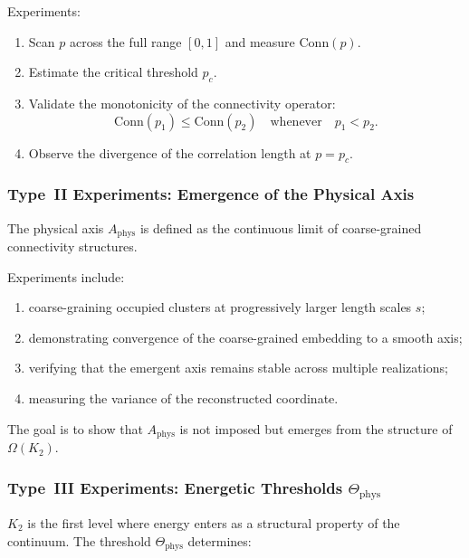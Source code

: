 Experiments:

\begin{enumerate}
    \item Scan $p$ across the full range $[0,1]$ and measure $\mathrm{Conn}(p)$.
    \item Estimate the critical threshold $p_c$.
    \item Validate the monotonicity of the connectivity operator:
          \[
             \mathrm{Conn}(p_1) \le \mathrm{Conn}(p_2)
             \quad \text{whenever} \quad p_1 < p_2.
          \]
    \item Observe the divergence of the correlation length at $p = p_c$.
\end{enumerate}



\subsubsection{Type~II Experiments: Emergence of the Physical Axis}

The physical axis $A_{\mathrm{phys}}$ is defined as the continuous limit of 
coarse-grained connectivity structures.

Experiments include:

\begin{enumerate}
    \item coarse-graining occupied clusters at progressively larger length 
          scales $s$;
    \item demonstrating convergence of the coarse-grained embedding to a 
          smooth axis;
    \item verifying that the emergent axis remains stable across multiple 
          realizations;
    \item measuring the variance of the reconstructed coordinate.
\end{enumerate}

The goal is to show that $A_{\mathrm{phys}}$ is not imposed but emerges 
from the structure of $\Omega(K_2)$.



\subsubsection{Type~III Experiments: Energetic Thresholds $\Theta_{\mathrm{phys}}$}

$K_2$ is the first level where energy enters as a structural property of the 
continuum.  
The threshold $\Theta_{\mathrm{phys}}$ determines:

